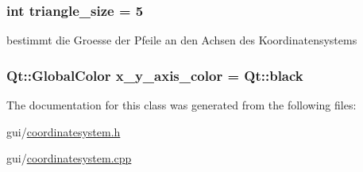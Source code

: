\subsubsection[{\texorpdfstring{triangle\+\_\+size}{triangle_size}}]{\setlength{\rightskip}{0pt plus 5cm}int triangle\+\_\+size = 5\hspace{0.3cm}{\ttfamily [protected]}}\hypertarget{classGUI_1_1CoordinateSystem_aac44d9cfd174bff52e3126dcc059d851}{}\label{classGUI_1_1CoordinateSystem_aac44d9cfd174bff52e3126dcc059d851}


bestimmt die Groesse der Pfeile an den Achsen des Koordinatensystems 

\subsubsection[{\texorpdfstring{x\+\_\+y\+\_\+axis\+\_\+color}{x_y_axis_color}}]{\setlength{\rightskip}{0pt plus 5cm}Qt\+::\+Global\+Color x\+\_\+y\+\_\+axis\+\_\+color = Qt\+::black}\hypertarget{classGUI_1_1CoordinateSystem_a105b11a9cc588b3a0b7c6208b270d5c9}{}\label{classGUI_1_1CoordinateSystem_a105b11a9cc588b3a0b7c6208b270d5c9}


The documentation for this class was generated from the following files\+:\begin{DoxyCompactItemize}
\item 
gui/\hyperlink{coordinatesystem_8h}{coordinatesystem.\+h}\item 
gui/\hyperlink{coordinatesystem_8cpp}{coordinatesystem.\+cpp}\end{DoxyCompactItemize}
